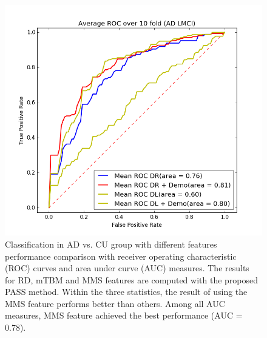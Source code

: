 \begin{figure}
	\centering
	\includegraphics[width=\linewidth]{figures/AD_LMCI}
	\caption[ROC for AD vs. LMCI]{Classification in AD vs. CU group with different features performance comparison with receiver operating characteristic (ROC) curves and area under curve (AUC) measures. The results for RD, mTBM and MMS features are computed with the proposed PASS method. Within the three statistics, the result of using the MMS feature performs better than others. Among all AUC measures, MMS feature achieved the best performance (AUC = 0.78).}
	\label{fig:adlmci}
\end{figure}
